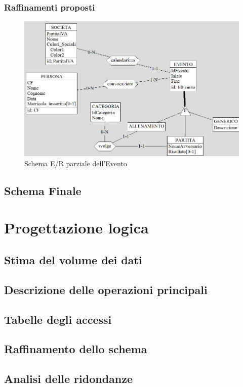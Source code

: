 \documentclass[a4paper,12pt]{report}
\begin{document}
\subsection{Raffinamenti proposti}

\begin{figure}[htp]
    \centering
    \includegraphics[width = \textwidth]{GSS_report/img/evento_raffinamento.png}
    \caption{Schema E/R parziale dell'Evento}
\end{figure}
\newpage
\section{Schema Finale}

\chapter{Progettazione logica}
\section{Stima del volume dei dati}
\section{Descrizione delle operazioni principali}
\section{Tabelle degli accessi}
\section{Raffinamento dello schema}
\section{Analisi delle ridondanze}
\end{document}
